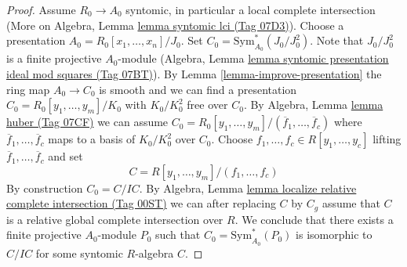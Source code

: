 \documentclass{amsart}
\theoremstyle{plain}
\theoremstyle{definition}
\theoremstyle{remark}
\numberwithin{equation}{subsection}
\begin{document}
\begin{proof}
Assume $R_0 \to A_0$ syntomic, in particular a local complete intersection
(More on Algebra, Lemma \href{https://stacks.math.columbia.edu/tag/07D3}{lemma syntomic lci (Tag 07D3)}).
Choose a presentation $A_0 = R_0[x_1, \ldots, x_n]/J_0$. Set
$C_0 = \text{Sym}^*_{A_0}(J_0/J_0^2)$. Note that $J_0/J_0^2$ is a finite
projective $A_0$-module (Algebra, Lemma
\href{https://stacks.math.columbia.edu/tag/07BT}{lemma syntomic presentation ideal mod squares (Tag 07BT)}).
By Lemma \ref{lemma-improve-presentation} the ring map
$A_0 \to C_0$ is smooth and we can find a presentation
$C_0 = R_0[y_1, \ldots, y_m]/K_0$ with $K_0/K_0^2$ free over $C_0$.
By Algebra, Lemma \href{https://stacks.math.columbia.edu/tag/07CF}{lemma huber (Tag 07CF)} we can assume
$C_0 = R_0[y_1, \ldots, y_m]/(\overline{f}_1, \ldots, \overline{f}_c)$
where $\overline{f}_1, \ldots, \overline{f}_c$ maps to a basis of
$K_0/K_0^2$ over $C_0$. Choose
$f_1, \ldots, f_c \in R[y_1, \ldots, y_c]$ lifting
$\overline{f}_1, \ldots, \overline{f}_c$ and set
$$
C = R[y_1, \ldots, y_m]/(f_1, \ldots, f_c)
$$
By construction $C_0 = C/IC$. By Algebra, Lemma
\href{https://stacks.math.columbia.edu/tag/00ST}{lemma localize relative complete intersection (Tag 00ST)}
we can after replacing $C$ by $C_g$ assume that $C$ is a relative
global complete intersection over $R$.
We conclude that there exists a finite projective $A_0$-module
$P_0$ such that $C_0 = \text{Sym}^*_{A_0}(P_0)$
is isomorphic to $C/IC$ for some syntomic $R$-algebra $C$.


\end{proof}
\end{document}
